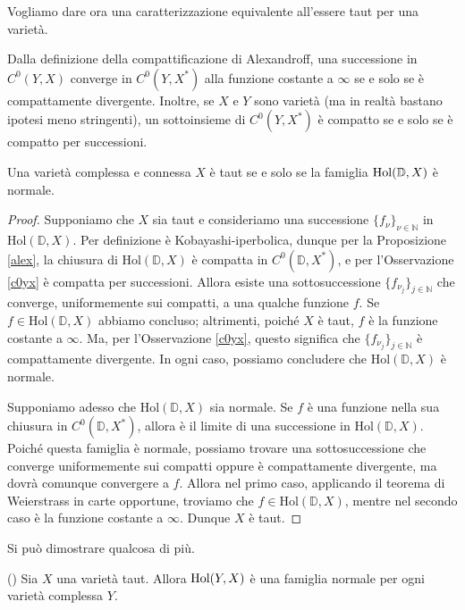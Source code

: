 Vogliamo dare ora una caratterizzazione equivalente all'essere taut per una varietà.

\begin{oss} \label{c0yx}
    Dalla definizione della compattificazione di Alexandroff, una successione in $C^0(Y,X)$ converge in $C^0(Y,X^*)$ alla funzione costante a $\infty$ se e solo se è compattamente divergente. Inoltre, se $X$ e $Y$ sono varietà (ma in realtà bastano ipotesi meno stringenti), un sottoinsieme di $C^0(Y,X^*)$ è compatto se e solo se è compatto per successioni.
\end{oss}

\begin{prop}
    Una varietà complessa e connessa $X$ è taut se e solo se la famiglia $\textnormal{Hol}(\mathbb{D},X)$ è normale.
\end{prop}
\begin{proof}
    Supponiamo che $X$ sia taut e consideriamo una successione $\{f_{\nu}\}_{\nu\in\mathbb{N}}$ in $\text{Hol}(\mathbb{D},X)$. Per definizione è Kobayashi-iperbolica, dunque per la Proposizione \ref{alex}, la chiusura di $\text{Hol}(\mathbb{D},X)$ è compatta in $C^0(\mathbb{D},X^*)$, e per l'Osservazione \ref{c0yx} è compatta per successioni. Allora esiste una sottosuccessione $\{f_{\nu_j}\}_{j \in \mathbb{N}}$ che converge, uniformemente sui compatti, a una qualche funzione $f$. Se $f \in \text{Hol}(\mathbb{D},X)$ abbiamo concluso; altrimenti, poiché $X$ è taut, $f$ è la funzione costante a $\infty$. Ma, per l'Osservazione \ref{c0yx}, questo significa che $\{f_{\nu_j}\}_{j \in \mathbb{N}}$ è compattamente divergente. In ogni caso, possiamo concludere che $\text{Hol}(\mathbb{D},X)$ è normale.

    Supponiamo adesso che $\text{Hol}(\mathbb{D},X)$ sia normale. Se $f$ è una funzione nella sua chiusura in $C^0(\mathbb{D},X^*)$, allora è il limite di una successione in $\text{Hol}(\mathbb{D},X)$. Poiché questa famiglia è normale, possiamo trovare una sottosuccessione che converge uniformemente sui compatti oppure è compattamente divergente, ma dovrà comunque convergere a $f$. Allora nel primo caso, applicando il teorema di Weierstrass in carte opportune, troviamo che $f \in \text{Hol}(\mathbb{D},X)$, mentre nel secondo caso è la funzione costante a $\infty$. Dunque $X$ è taut.
\end{proof}

Si può dimostrare qualcosa di più.

\begin{prop}
    (\cite[Chapter 2, Paragraph 2.1, Theorem 2.1.2]{A1}) Sia $X$ una varietà taut. Allora $\textnormal{Hol}(Y,X)$ è una famiglia normale per ogni varietà complessa $Y$.
\end{prop}

